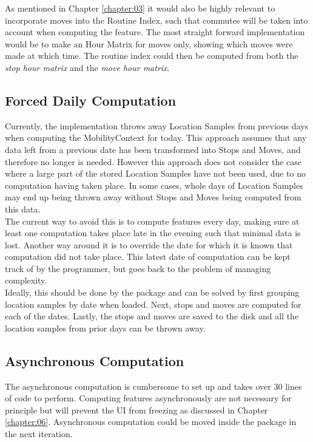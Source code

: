 As mentioned in Chapter \ref{chapter:03} it would also be highly relevant to incorporate moves into the Routine Index, such that commutes will be taken into account when computing the feature. The most straight forward implementation would be to make an Hour Matrix for moves only, showing which moves were made at which time. The routine index could then be computed from both the \textit{stop hour matrix} and the \textit{move hour matrix}.\\

\subsection{Forced Daily Computation}
Currently, the implementation throws away Location Samples from previous days when computing the MobilityContext for today. This approach assumes that any data left from a previous date has been transformed into Stops and Moves, and therefore no longer is needed. However this approach does not consider the case where a large part of the stored Location Samples have not been used, due to no computation having taken place. In some cases, whole days of Location Samples may end up being thrown away without Stops and Moves being computed from this data.\\

The current way to avoid this is to compute features every day, making sure at least one computation takes place late in the evening such that minimal data is lost. Another way around it is to override the date for which it is known that computation did not take place. This latest date of computation can be kept track of by the programmer, but goes back to the problem of managing complexity. \\

Ideally, this should be done by the package and can be solved by first grouping location samples by date when loaded. Next, stops and moves are computed for each of the dates. Lastly, the stops and moves are saved to the disk and all the location samples from prior days can be thrown away.

\subsection{Asynchronous Computation}
The asynchronous computation is cumbersome to set up and takes over 30 lines of code to perform. Computing features asynchronously are not necessary for principle but will prevent the UI from freezing as discussed in Chapter \ref{chapter:06}. Asynchronous computation could be moved inside the package in the next iteration.\\

